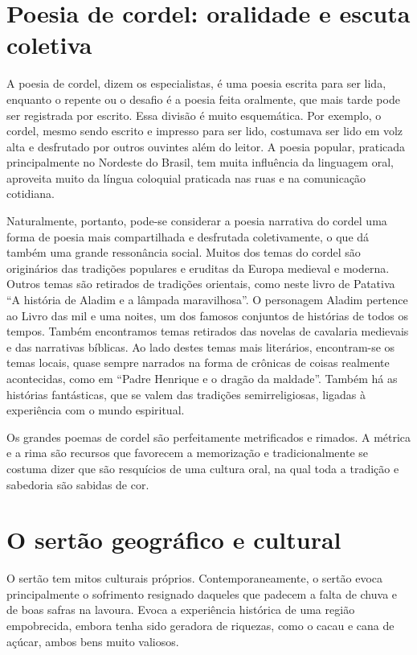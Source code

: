 \section{Poesia de cordel: oralidade e escuta coletiva} 

A poesia de cordel, dizem os especialistas, é uma poesia escrita para ser lida,
enquanto o repente ou o desafio é a poesia feita oralmente, que mais tarde pode
ser registrada por escrito. Essa divisão é muito esquemática. Por exemplo, o
cordel, mesmo sendo escrito e impresso para ser lido, costumava ser lido em
volz alta e desfrutado por outros ouvintes além do leitor. A poesia popular,
praticada principalmente no Nordeste do Brasil, tem muita influência da
linguagem oral, aproveita muito da língua coloquial praticada nas ruas e na
comunicação cotidiana. 

Naturalmente, portanto, pode-se considerar a poesia narrativa do cordel uma
forma de poesia mais compartilhada e desfrutada coletivamente, o que dá também
uma grande ressonância social. Muitos dos temas do cordel são originários das
tradições populares e eruditas da Europa medieval e moderna. Outros temas são
retirados de tradições orientais, como neste livro de Patativa “A história de
Aladim e a lâmpada maravilhosa”. O personagem Aladim pertence ao Livro das mil
e uma noites, um dos famosos conjuntos de histórias de todos os tempos. Também
encontramos temas retirados das novelas de cavalaria medievais e das narrativas
bíblicas. Ao lado destes temas mais literários, encontram-se os temas locais,
quase sempre narrados na forma de crônicas de coisas realmente acontecidas,
como em “Padre Henrique e o dragão da maldade”. Também há as histórias
fantásticas, que se valem das tradições semirreligiosas, ligadas à experiência
com o mundo espiritual. 

Os grandes poemas de cordel são perfeitamente metrificados e rimados. A métrica
e a rima são recursos que favorecem a memorização e tradicionalmente se costuma
dizer que são resquícios de uma cultura oral, na qual toda a tradição e
sabedoria são sabidas de cor.  


\section{O sertão geográfico e cultural}

O sertão tem mitos culturais próprios. Contemporaneamente, o sertão evoca
principalmente o sofrimento resignado daqueles que padecem a falta de chuva e
de boas safras na lavoura. Evoca a experiência histórica de uma região
empobrecida, embora tenha sido geradora de riquezas, como o cacau e cana de
açúcar, ambos bens muito valiosos. 

